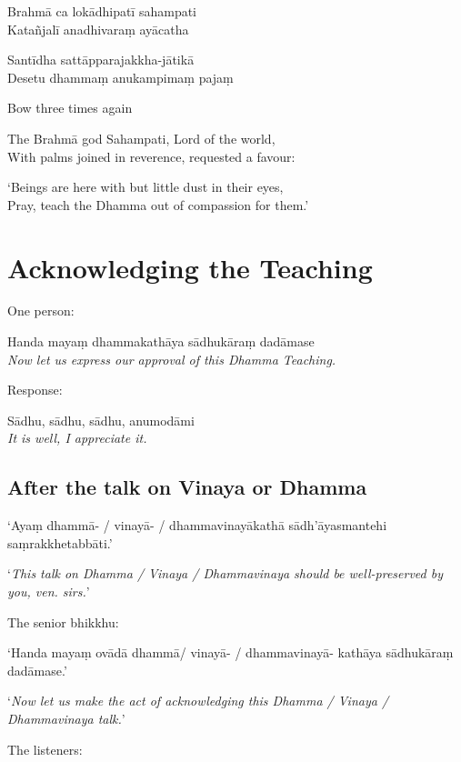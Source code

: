 Brahmā ca lokādhipatī sahampati\\
Katañjalī anadhivaraṃ ayācatha

Santīdha sattāpparajakkha-jātikā\\
Desetu dhammaṃ anukampimaṃ pajaṃ

\begin{instruction}
  Bow three times again
\end{instruction}

\begin{english}
The Brahmā god Sahampati, Lord of the world,\\
With palms joined in reverence, requested a favour:

`Beings are here with but little dust in their eyes,\\
Pray, teach the Dhamma out of compassion for them.' 
\end{english}

\section{Acknowledging the Teaching}

One person:

Handa mayaṃ dhammakathāya sādhukāraṃ dadāmase\\
\emph{Now let us express our approval of this Dhamma Teaching.}

Response:

Sādhu, sādhu, sādhu, anumodāmi\\
\emph{It is well, I appreciate it.}

\subsection{After the talk on Vinaya or Dhamma}

‘Ayaṃ dhammā- / vinayā- / dhammavinayākathā sādh'āyasmantehi saṃrakkhetabbāti.’

‘\emph{This talk on Dhamma / Vinaya / Dhammavinaya should be well-preserved by you, ven. sirs.}’

The senior bhikkhu:

‘Handa mayaṃ ovādā dhammā/ vinayā- / dhammavinayā- kathāya sādhukāraṃ dadāmase.’

‘\emph{Now let us make the act of acknowledging this Dhamma / Vinaya / Dhammavinaya talk.}’

\ifhandbookedition
\enlargethispage{\baselineskip}
\fi

The listeners:


